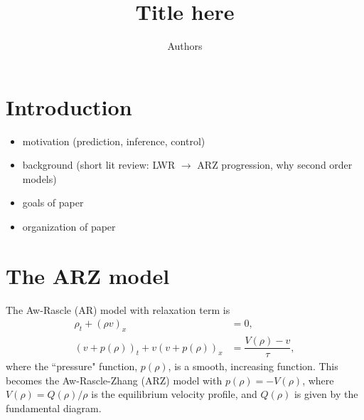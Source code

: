 \documentclass[review]{elsarticle}
\begin{document}
\begin{frontmatter}

\title{Title here}

\author[add]{Authors}
\address[add]{address}
%
%
%

\begin{abstract}

\end{abstract}

\begin{keyword}

\end{keyword}

\end{frontmatter}


\section{Introduction}
\begin{itemize}
\item motivation (prediction, inference, control)
\item background (short lit review: LWR $\rightarrow$ ARZ progression, why second order models)
\item goals of paper
\item organization of paper
\end{itemize}
\section{The ARZ model}

The Aw-Rascle (AR) model \cite{AR} with relaxation term is
\begin{align} 
\rho_t + (\rho v)_x &= 0, \label{ARZ1} \\
(v + p(\rho))_t + v(v + p(\rho))_x &=\dfrac{V(\rho) - v}{\tau} \label{ARZ2},
\end{align}
where the ``pressure" function, $p(\rho)$, is a smooth, increasing function. This becomes the Aw-Rascle-Zhang (ARZ) model \cite{Z} with $p(\rho) = -V(\rho)$, where $V(\rho) = Q(\rho)/\rho$ is the equilibrium velocity profile, and $Q(\rho)$ is given by the fundamental diagram. \\
\end{document}
